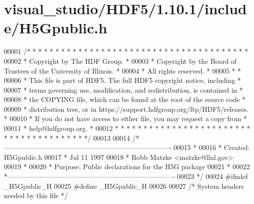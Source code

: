 \hypertarget{visual__studio_2_h_d_f5_21_810_81_2include_2_h5_gpublic_8h_source}{}\section{visual\+\_\+studio/\+H\+D\+F5/1.10.1/include/\+H5\+Gpublic.h}
\label{visual__studio_2_h_d_f5_21_810_81_2include_2_h5_gpublic_8h_source}

\begin{DoxyCode}
00001 \textcolor{comment}{/* * * * * * * * * * * * * * * * * * * * * * * * * * * * * * * * * * * * * * *}
00002 \textcolor{comment}{ * Copyright by The HDF Group.                                               *}
00003 \textcolor{comment}{ * Copyright by the Board of Trustees of the University of Illinois.         *}
00004 \textcolor{comment}{ * All rights reserved.                                                      *}
00005 \textcolor{comment}{ *                                                                           *}
00006 \textcolor{comment}{ * This file is part of HDF5.  The full HDF5 copyright notice, including     *}
00007 \textcolor{comment}{ * terms governing use, modification, and redistribution, is contained in    *}
00008 \textcolor{comment}{ * the COPYING file, which can be found at the root of the source code       *}
00009 \textcolor{comment}{ * distribution tree, or in https://support.hdfgroup.org/ftp/HDF5/releases.  *}
00010 \textcolor{comment}{ * If you do not have access to either file, you may request a copy from     *}
00011 \textcolor{comment}{ * help@hdfgroup.org.                                                        *}
00012 \textcolor{comment}{ * * * * * * * * * * * * * * * * * * * * * * * * * * * * * * * * * * * * * * */}
00013 
00014 \textcolor{comment}{/*-------------------------------------------------------------------------}
00015 \textcolor{comment}{ *}
00016 \textcolor{comment}{ * Created:             H5Gpublic.h}
00017 \textcolor{comment}{ *                      Jul 11 1997}
00018 \textcolor{comment}{ *                      Robb Matzke <matzke@llnl.gov>}
00019 \textcolor{comment}{ *}
00020 \textcolor{comment}{ * Purpose:             Public declarations for the H5G package}
00021 \textcolor{comment}{ *}
00022 \textcolor{comment}{ *-------------------------------------------------------------------------}
00023 \textcolor{comment}{ */}
00024 \textcolor{preprocessor}{#ifndef \_H5Gpublic\_H}
00025 \textcolor{preprocessor}{#define \_H5Gpublic\_H}
00026 
00027 \textcolor{comment}{/* System headers needed by this file */}

\end{DoxyCode}
